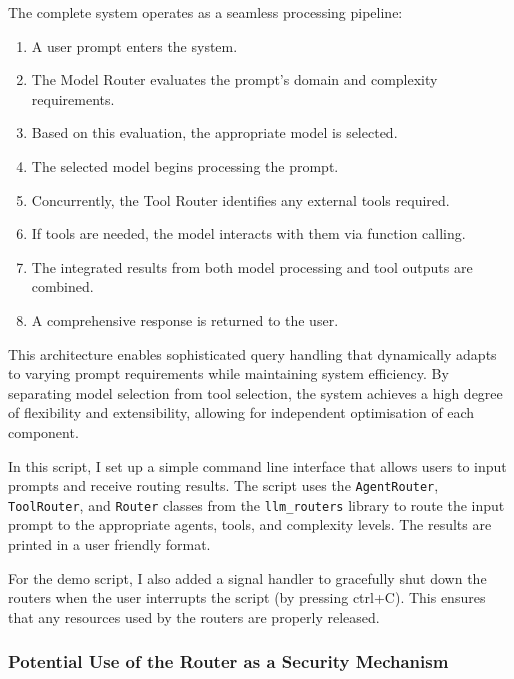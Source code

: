 The complete system operates as a seamless processing pipeline:

\begin{enumerate}
    \item A user prompt enters the system.
    \item The Model Router evaluates the prompt's domain and complexity requirements.
    \item Based on this evaluation, the appropriate model is selected.
    \item The selected model begins processing the prompt.
    \item Concurrently, the Tool Router identifies any external tools required.
    \item If tools are needed, the model interacts with them via function calling.
    \item The integrated results from both model processing and tool outputs are combined.
    \item A comprehensive response is returned to the user.
\end{enumerate}

This architecture enables sophisticated query handling that dynamically adapts to varying prompt requirements while maintaining system efficiency. By separating model selection from tool selection, the system achieves a high degree of flexibility and extensibility, allowing for independent optimisation of each component.

In this script, I set up a simple command line interface that allows users to input prompts and receive routing results. The script uses the \texttt{AgentRouter}, \texttt{ToolRouter}, and \texttt{Router} classes from the \texttt{llm\_routers} library to route the input prompt to the appropriate agents, tools, and complexity levels. The results are printed in a user friendly format.

For the demo script, I also added a signal handler to gracefully shut down the routers when the user interrupts the script (by pressing ctrl+C). This ensures that any resources used by the routers are properly released.



\subsubsection{Potential Use of the Router as a Security Mechanism}
\label{sec:router_security}

